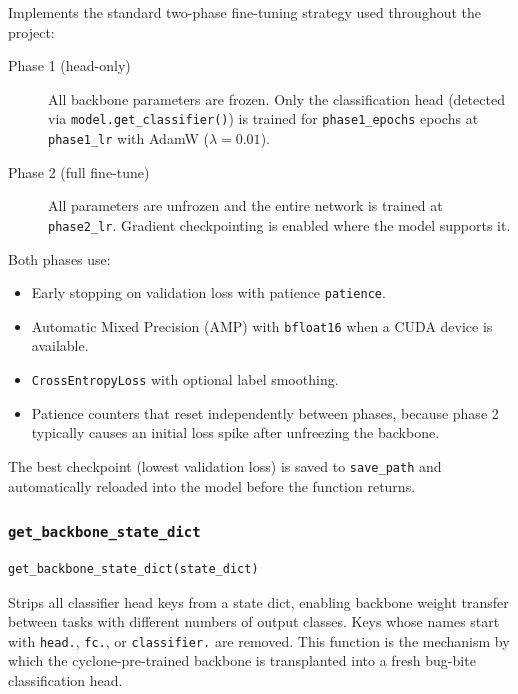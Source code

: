 \documentclass[12pt,a4paper]{article}
\begin{document}
Implements the standard two-phase fine-tuning strategy used throughout the
project:

\begin{description}
    \item[Phase 1 (head-only)] All backbone parameters are frozen.
          Only the classification head (detected via \texttt{model.get\_classifier()})
          is trained for \texttt{phase1\_epochs} epochs at \texttt{phase1\_lr}
          with AdamW ($\lambda = 0.01$).
    \item[Phase 2 (full fine-tune)] All parameters are unfrozen and the
          entire network is trained at \texttt{phase2\_lr}. Gradient checkpointing
          is enabled where the model supports it.
\end{description}

Both phases use:
\begin{itemize}
    \item Early stopping on validation loss with patience \texttt{patience}.
    \item Automatic Mixed Precision (AMP) with \texttt{bfloat16} when a CUDA
          device is available.
    \item \texttt{CrossEntropyLoss} with optional label smoothing.
    \item Patience counters that reset independently between phases,
          because phase 2 typically causes an initial loss spike after
          unfreezing the backbone.
\end{itemize}

The best checkpoint (lowest validation loss) is saved to \texttt{save\_path}
and automatically reloaded into the model before the function returns.

\subsubsection{\texttt{get\_backbone\_state\_dict}}

\begin{lstlisting}[language=Python]
get_backbone_state_dict(state_dict)
\end{lstlisting}

Strips all classifier head keys from a state dict, enabling backbone weight
transfer between tasks with different numbers of output classes. Keys whose
names start with \texttt{head.}, \texttt{fc.}, or \texttt{classifier.} are
removed. This function is the mechanism by which the cyclone-pre-trained
backbone is transplanted into a fresh bug-bite classification head.
\end{document}
